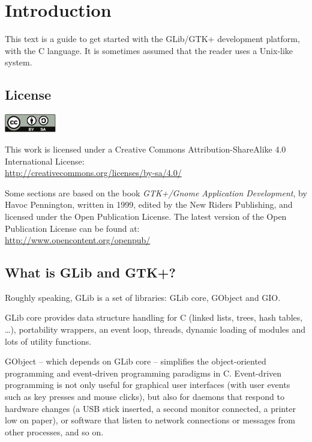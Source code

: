 \chapter{Introduction}

This text is a guide to get started with the GLib/GTK+ development platform, with the C language. It is sometimes assumed that the reader uses a Unix-like system.

\section{License}
\label{intro-license}

\begin{center}
  \includegraphics[height=0.8cm]{images/creative-commons.pdf}
\end{center}

This work is licensed under a Creative Commons Attribution-ShareAlike 4.0 International License:\\
\url{http://creativecommons.org/licenses/by-sa/4.0/}

Some sections are based on the book \emph{GTK+/Gnome Application Development}, by Havoc Pennington, written in 1999, edited by the New Riders Publishing, and licensed under the Open Publication License. The latest version of the Open Publication License can be found at:\\
\url{http://www.opencontent.org/openpub/}

\section{What is GLib and GTK+?}

Roughly speaking, GLib is a set of libraries: GLib core, GObject and GIO.

GLib core provides data structure handling for C (linked lists, trees, hash tables, …), portability wrappers, an event loop, threads, dynamic loading of modules and lots of utility functions.

GObject -- which depends on GLib core -- simplifies the object-oriented programming and event-driven programming paradigms in C. Event-driven programming is not only useful for graphical user interfaces (with user events such as key presses and mouse clicks), but also for daemons that respond to hardware changes (a USB stick inserted, a second monitor connected, a printer low on paper), or software that listen to network connections or messages from other processes, and so on.

